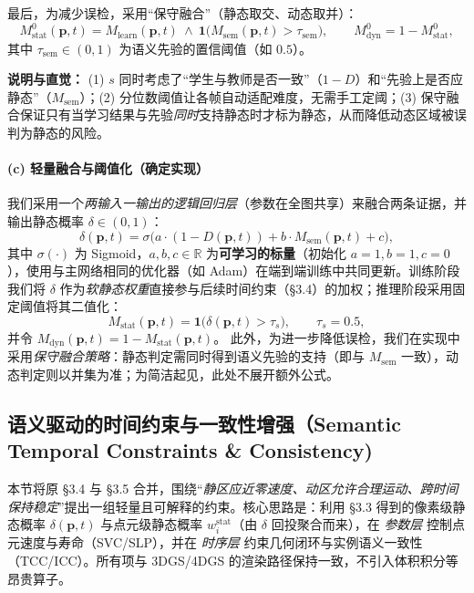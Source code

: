 \documentclass[10pt,conference]{IEEEtran} %
\begin{document}
最后，为减少误检，采用“保守融合”（静态取交、动态取并）：
\begin{equation}
M_{\mathrm{stat}}^{0}(\mathbf p,t)=M_{\mathrm{learn}}(\mathbf p,t)\ \wedge\ \mathbf 1\!\bigl(M_{\mathrm{sem}}(\mathbf p,t)>\tau_{\mathrm{sem}}\bigr),\qquad
M_{\mathrm{dyn}}^{0}=1-M_{\mathrm{stat}}^{0},
\label{eq:demm_fuse_simple}
\end{equation}
其中 $\tau_{\mathrm{sem}}\in(0,1)$ 为语义先验的置信阈值（如 $0.5$）。

\noindent\textbf{说明与直觉：}
(1) $s$ 同时考虑了“学生与教师是否一致”（$1{-}D$）和“先验上是否应静态”（$M_{\mathrm{sem}}$）；(2) 分位数阈值让各帧自动适配难度，无需手工定阈；(3) 保守融合保证只有当学习结果与先验\emph{同时}支持静态时才标为静态，从而降低动态区域被误判为静态的风险。


\paragraph{(c) 轻量融合与阈值化（确定实现）}
我们采用一个\emph{两输入一输出的逻辑回归层}（参数在全图共享）来融合两条证据，并输出静态概率 $\delta\in(0,1)$：
\begin{equation}
\delta(\mathbf p,t)=\sigma\!\big(a\cdot(1-D(\mathbf p,t))+b\cdot M_{\mathrm{sem}}(\mathbf p,t)+c\big),
\label{eq:demm_delta_final}
\end{equation}
其中 $\sigma(\cdot)$ 为 Sigmoid，$a,b,c\in\mathbb{R}$ 为\textbf{可学习的标量}（初始化 $a{=}1,b{=}1,c{=}0$），使用与主网络相同的优化器（如 Adam）在端到端训练中共同更新。训练阶段我们将 $\delta$ 作为\emph{软静态权重}直接参与后续时间约束（§3.4）的加权；推理阶段采用固定阈值将其二值化：
\begin{equation}
M_{\mathrm{stat}}(\mathbf p,t)=\mathbf{1}\!\big(\delta(\mathbf p,t)>\tau_s\big),\qquad \tau_s=0.5,
\label{eq:demm_binarize_final}
\end{equation}
并令 $M_{\mathrm{dyn}}(\mathbf p,t)=1-M_{\mathrm{stat}}(\mathbf p,t)$。
此外，为进一步降低误检，我们在实现中采用\emph{保守融合策略}：静态判定需同时得到语义先验的支持（即与 $M_{\mathrm{sem}}$ 一致），动态判定则以并集为准；为简洁起见，此处不展开额外公式。



\subsection{语义驱动的时间约束与一致性增强（Semantic Temporal Constraints \& Consistency)}
本节将原 §3.4 与 §3.5 合并，围绕“\emph{静区应近零速度、动区允许合理运动、跨时间保持稳定}”提出一组轻量且可解释的约束。核心思路是：利用 §3.3 得到的像素级静态概率 $\delta(\mathbf p,t)$ 与点元级静态概率 $w_i^{\mathrm{stat}}$（由 $\delta$ 回投聚合而来），在 \emph{参数层} 控制点元速度与寿命（SVC/SLP），并在 \emph{时序层} 约束几何闭环与实例语义一致性（TCC/ICC）。所有项与 3DGS/4DGS 的渲染路径保持一致，不引入体积积分等昂贵算子。
\end{document}
